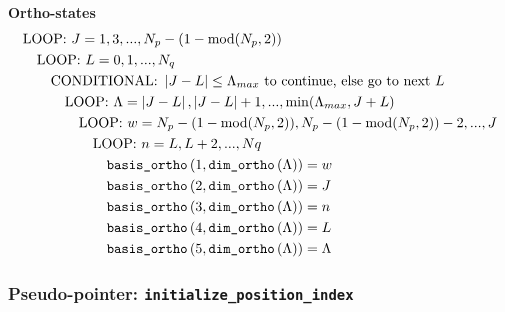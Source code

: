 \documentclass[english,twoside, openright]{report}
\newcommand{\Abs}[1]{
  \left|#1\right|
}
\begin{document}
\textbf{Ortho-states}
\begin{align}
  &\text{LOOP: } J=1,3,..., N_p-(1-\text{mod}(N_p,2))
    \nonumber \\
  & \quad\text{LOOP: }L=0,1,...,N_q \nonumber \\
  & \quad\quad\text{CONDITIONAL: } \Abs{J-L}\leq \Lambda_{max} \text{ to
    continue, else go to next }L \nonumber \\
  &\quad\quad\quad\text{LOOP:
} \Lambda=\Abs{J-L},\Abs{J-L}+1,...,\min(\Lambda_{max},J+L) \nonumber
  \\
  &\quad\quad\quad\quad\text{LOOP: } w=N_p-(1-\text{mod}(N_p,2)),N_p-(1-\text{mod}(N_p,2))-2,...,J \nonumber \\
  &\quad\quad\quad\quad\quad\text{LOOP: } n=L,L+2,...,Nq \\
  &\quad\quad\quad\quad\quad\quad
\text{\texttt{basis\_ortho}}\left(1,\text{\texttt{dim\_ortho}}\left(\Lambda\right)\right)=w
    \nonumber \\
  &\quad\quad\quad\quad\quad\quad
\text{\texttt{basis\_ortho}}\left(2,\text{\texttt{dim\_ortho}}\left(\Lambda\right)\right)=J
    \nonumber \\
  &\quad\quad\quad\quad\quad\quad
\text{\texttt{basis\_ortho}}\left(3,\text{\texttt{dim\_ortho}}\left(\Lambda\right)\right)=n
    \nonumber \\
  &\quad\quad\quad\quad\quad\quad
\text{\texttt{basis\_ortho}}\left(4,\text{\texttt{dim\_ortho}}\left(\Lambda\right)\right)=L
    \nonumber \\
  &\quad\quad\quad\quad\quad\quad
\text{\texttt{basis\_ortho}}\left(5,\text{\texttt{dim\_ortho}}\left(\Lambda\right)\right)=\Lambda
\nonumber
\end{align}

\subsubsection{Pseudo-pointer: \texttt{initialize\_position\_index}}
\end{document}
